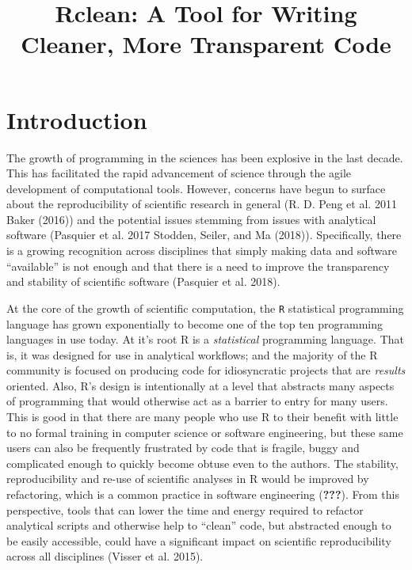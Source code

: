 \documentclass[]{article}
\title{Rclean: A Tool for Writing Cleaner, More Transparent Code}
\author{}
\date{\vspace{-2.5em}}
\begin{document}
\maketitle

\section{Introduction}\label{introduction}

The growth of programming in the sciences has been explosive in the last
decade. This has facilitated the rapid advancement of science through
the agile development of computational tools. However, concerns have
begun to surface about the reproducibility of scientific research in
general (R. D. Peng et al. 2011 Baker (2016)) and the potential issues
stemming from issues with analytical software (Pasquier et al. 2017
Stodden, Seiler, and Ma (2018)). Specifically, there is a growing
recognition across disciplines that simply making data and software
``available'' is not enough and that there is a need to improve the
transparency and stability of scientific software (Pasquier et al.
2018).

At the core of the growth of scientific computation, the \texttt{R}
statistical programming language has grown exponentially to become one
of the top ten programming languages in use today. At it's root R is a
\emph{statistical} programming language. That is, it was designed for
use in analytical workflows; and the majority of the R community is
focused on producing code for idiosyncratic projects that are
\emph{results} oriented. Also, R's design is intentionally at a level
that abstracts many aspects of programming that would otherwise act as a
barrier to entry for many users. This is good in that there are many
people who use R to their benefit with little to no formal training in
computer science or software engineering, but these same users can also
be frequently frustrated by code that is fragile, buggy and complicated
enough to quickly become obtuse even to the authors. The stability,
reproducibility and re-use of scientific analyses in R would be improved
by refactoring, which is a common practice in software engineering
({\textbf{???}}). From this perspective, tools that can lower the time
and energy required to refactor analytical scripts and otherwise help to
``clean'' code, but abstracted enough to be easily accessible, could
have a significant impact on scientific reproducibility across all
disciplines (Visser et al. 2015).
\end{document}
